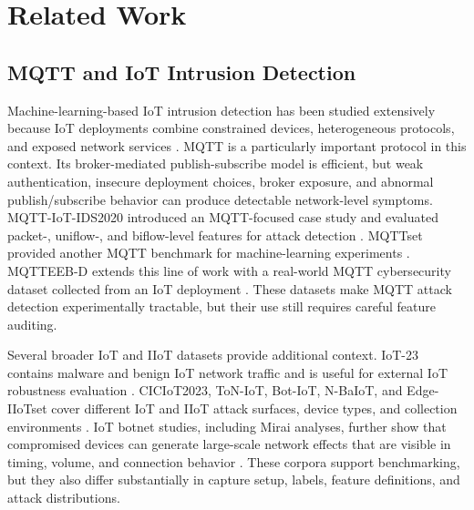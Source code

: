 \documentclass[lettersize,journal]{IEEEtran}
\begin{document}
\section{Related Work}
\label{sec:related}
\subsection{MQTT and IoT Intrusion Detection}
Machine-learning-based IoT intrusion detection has been studied extensively because IoT deployments combine constrained devices, heterogeneous protocols, and exposed network services \cite{algaradi2020survey,hussain2020machine,hodo2017taxonomy,buczak2016survey,khraisat2019survey}. MQTT is a particularly important protocol in this context. Its broker-mediated publish-subscribe model is efficient, but weak authentication, insecure deployment choices, broker exposure, and abnormal publish/subscribe behavior can produce detectable network-level symptoms. MQTT-IoT-IDS2020 introduced an MQTT-focused case study and evaluated packet-, uniflow-, and biflow-level features for attack detection \cite{hindy2020mqttiot}. MQTTset provided another MQTT benchmark for machine-learning experiments \cite{vaccari2020mqttset}. MQTTEEB-D extends this line of work with a real-world MQTT cybersecurity dataset collected from an IoT deployment \cite{mqtteebd2025}. These datasets make MQTT attack detection experimentally tractable, but their use still requires careful feature auditing.

Several broader IoT and IIoT datasets provide additional context. IoT-23 contains malware and benign IoT network traffic and is useful for external IoT robustness evaluation \cite{iot23}. CICIoT2023, ToN-IoT, Bot-IoT, N-BaIoT, and Edge-IIoTset cover different IoT and IIoT attack surfaces, device types, and collection environments \cite{ciciot2023,alsaedi2020toniot,koroniotis2019botiot,meidan2018nbaiot,ferrag2022edgeiiotset}. IoT botnet studies, including Mirai analyses, further show that compromised devices can generate large-scale network effects that are visible in timing, volume, and connection behavior \cite{antonakakis2017mirai,kolias2017mirai}. These corpora support benchmarking, but they also differ substantially in capture setup, labels, feature definitions, and attack distributions.
\end{document}

